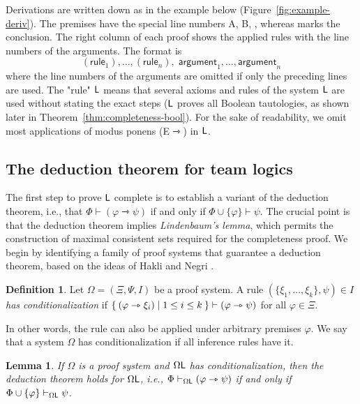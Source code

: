 \documentclass[a4paper,english,fleqn,11pt,final]{scrartcl}
\makeatletter
\newcommand{\ie}{i.e.\@\xspace}
\newcommand{\sfL}{\protect\ensuremath{\mathsf{L}}}
\newcommand{\timp}{\rightarrowtriangle}
\newcommand{\Deriv}[1]{{\normalfont\textsf{#1}}}
\theoremstyle{plain}
\newtheorem{lemma}[theorem]{Lemma}
\theoremstyle{definition}
\newtheorem{definition}[theorem]{Definition}
\makeatother
\begin{document}
Derivations are written down as in the example below (Figure~\ref{fig:example-deriv}).
The premises have the special line numbers A, B, \textellipsis, whereas \slider marks the conclusion.
The right column of each proof shows the applied rules with the line numbers of the arguments.
The format is
\[
(\mathsf{rule}_1), \ldots, (\mathsf{rule}_n), \; \mathsf{argument}_1,\ldots,\mathsf{argument}_n
\]
where the line numbers of the arguments are omitted if only the preceding lines are used.
The "rule" $\sfL$ means that several axioms and rules of the system $\sfL$ are used without stating the exact steps ($\sfL$ proves all Boolean tautologies, as shown later in Theorem~\ref{thm:completeness-bool}).
For the sake of readability, we omit most applications of modus ponens \Deriv{(E$\timp$)} in $\sfL$.

\subsection{The deduction theorem for team logics}

The first step to prove $\sfL$ complete is to establish a variant of the deduction theorem, \ie, that $\Phi \vdash (\varphi \timp \psi)$ if and only if $\Phi \cup \{\varphi\} \vdash \psi$.
The crucial point is that the deduction theorem implies \emph{Lindenbaum's lemma}, which permits the construction of maximal consistent sets required for the completeness proof.
We begin by identifying a family of proof systems that guarantee a deduction theorem, based on the ideas of Hakli and Negri \cite{deduction_fail}.

\begin{definition}
Let $\Omega = (\Xi, \Psi, I)$ be a proof system. A rule $(\{\xi_1,\ldots,\xi_k\},\psi) \in I$ \emph{has conditionalization} if $\Set{(\varphi \timp \xi_i) | 1 \leq i \leq k} \vdash (\varphi \timp \psi)$ for all $\varphi \in \Xi$.
\end{definition}

In other words, the rule can also be applied under arbitrary premises $\varphi$.
We say that a system $\Omega$ has conditionalization if all inference rules have it.

\begin{lemma}\label{lem:deduction-theorem}
If $\Omega$ is a proof system and $\Omega\sfL$ has conditionalization, then the deduction theorem holds for $\Omega\sfL$, \ie, $\Phi \vdash_{\Omega\sfL} (\varphi \timp \psi)$ if and only if $\Phi \cup \{\varphi\} \vdash_{\Omega\sfL} \psi$.
\end{lemma}
\end{document}
